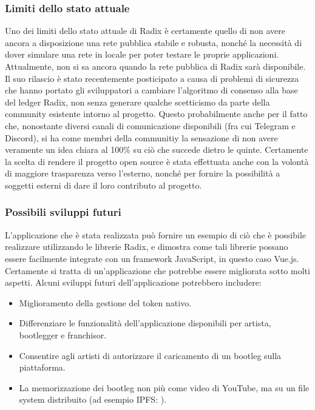\subsubsection{Limiti dello stato attuale}

Uno dei limiti dello stato attuale di Radix è certamente quello di non avere ancora a disposizione una rete pubblica stabile e robusta, nonché la necessità di dover simulare una rete in locale per poter testare le proprie applicazioni. Attualmente, non si sa ancora quando la rete pubblica di Radix sarà disponibile. Il suo rilascio è stato recentemente posticipato a causa di problemi di sicurezza che hanno portato gli sviluppatori a cambiare l'algoritmo di consenso alla base del ledger Radix, non senza generare qualche scetticismo da parte della community esistente intorno al progetto. Questo probabilmente anche per il fatto che, nonostante diversi canali di comunicazione disponibili (fra cui Telegram e Discord), si ha come membri della communitiy la sensazione di non avere veramente un idea chiara al 100\% su ciò che succede dietro le quinte. Certamente la scelta di rendere il progetto open source \cite{K20} è stata effettuata anche con la volontà di maggiore trasparenza verso l'esterno, nonché per fornire la possibilità a soggetti esterni di dare il loro contributo al progetto.

\subsubsection{Possibili sviluppi futuri}

L'applicazione che è stata realizzata può fornire un esempio di ciò che è possibile realizzare utilizzando le librerie Radix, e dimostra come tali librerie possano essere facilmente integrate con un framework JavaScript, in questo caso Vue.js. Certamente si tratta di un'applicazione che potrebbe essere migliorata sotto molti aspetti. Alcuni sviluppi futuri dell'applicazione potrebbero includere:
\begin{itemize}
    \item Miglioramento della gestione del token nativo.
    \item Differenziare le funzionalità dell'applicazione disponibili per artista, bootlegger e franchisor.
    \item Consentire agli artisti di autorizzare il caricamento di un bootleg sulla piattaforma.
    \item La memorizzazione dei bootleg non più come video di YouTube, ma su un file system distribuito  (ad esempio IPFS: \cite{K30}).
\end{itemize}
